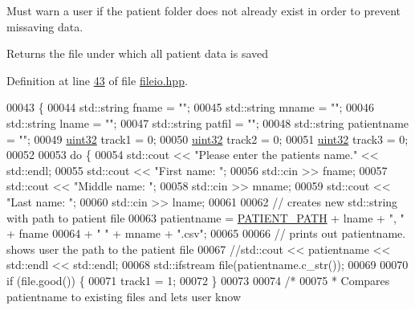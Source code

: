Must warn a user if the patient folder does not already exist in order to prevent missaving data.

\begin{DoxyReturn}{Returns}
the file under which all patient data is saved 
\end{DoxyReturn}


Definition at line \hyperlink{fileio_8hpp_source_l00043}{43} of file \hyperlink{fileio_8hpp_source}{fileio.\+hpp}.


\begin{DoxyCode}
00043                             \{
00044         std::string fname = \textcolor{stringliteral}{""};
00045         std::string mname = \textcolor{stringliteral}{""};
00046         std::string lname = \textcolor{stringliteral}{""};
00047         std::string patfil = \textcolor{stringliteral}{""};
00048         std::string patientname = \textcolor{stringliteral}{""};
00049         \hyperlink{definitions_8hpp_a1134b580f8da4de94ca6b1de4d37975e}{uint32} track1 = 0;
00050         \hyperlink{definitions_8hpp_a1134b580f8da4de94ca6b1de4d37975e}{uint32} track2 = 0;
00051         \hyperlink{definitions_8hpp_a1134b580f8da4de94ca6b1de4d37975e}{uint32} track3 = 0;
00052 
00053         \textcolor{keywordflow}{do} \{
00054             std::cout << \textcolor{stringliteral}{"Please enter the patients name."} << std::endl;
00055             std::cout << \textcolor{stringliteral}{"First name: "};
00056             std::cin >> fname;
00057             std::cout << \textcolor{stringliteral}{"Middle name: "};
00058             std::cin >> mname;
00059             std::cout << \textcolor{stringliteral}{"Last name: "};
00060             std::cin >> lname;
00061 
00062             \textcolor{comment}{// creates new std::string with path to patient file}
00063             patientname = \hyperlink{namespaceavda_a8ee73ec0cb55d4a13e89949764dce89d}{PATIENT\_PATH} + lname + \textcolor{stringliteral}{", "} + fname
00064                 + \textcolor{stringliteral}{" "} + mname + \textcolor{stringliteral}{".csv"};
00065 
00066             \textcolor{comment}{// prints out patientname. shows user the path to the patient file}
00067             \textcolor{comment}{//std::cout << patientname << std::endl << std::endl;}
00068             std::ifstream file(patientname.c\_str());
00069 
00070             \textcolor{keywordflow}{if} (file.good()) \{
00071                 track1 = 1;
00072             \}
00073 
00074             \textcolor{comment}{/*}
00075 \textcolor{comment}{             * Compares patientname to existing files and lets user know}

\end{DoxyCode}
